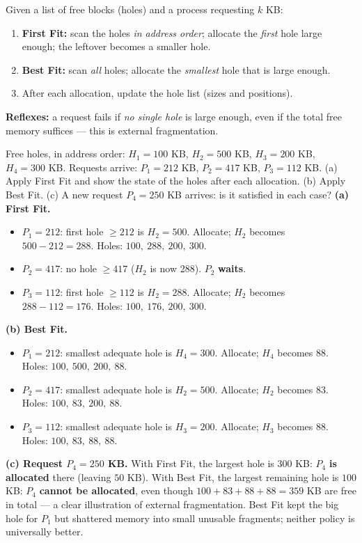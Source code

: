 \documentclass[11pt]{article}
\newcommand{\cle}[1]{{\popxbold\color{popdark}#1}}
\begin{document}
\begin{methode}
Given a list of free blocks (holes) and a process requesting $k$ KB:
\begin{enumerate}
\item \textbf{First Fit:} scan the holes \emph{in address order}; allocate the \emph{first} hole large enough; the leftover becomes a smaller hole.
\item \textbf{Best Fit:} scan \emph{all} holes; allocate the \emph{smallest} hole that is large enough.
\item After each allocation, update the hole list (sizes and positions).
\end{enumerate}
\textbf{Reflexes:} a request fails if \emph{no single hole} is large enough, even if the total free memory suffices — this is \cle{external fragmentation}.
\end{methode}

\begin{exoresolu}
Free holes, in address order: $H_1 = 100$ KB, $H_2 = 500$ KB, $H_3 = 200$ KB, $H_4 = 300$ KB. Requests arrive: $P_1 = 212$ KB, $P_2 = 417$ KB, $P_3 = 112$ KB. (a) Apply First Fit and show the state of the holes after each allocation. (b) Apply Best Fit. (c) A new request $P_4 = 250$ KB arrives: is it satisfied in each case?
\tcblower
\textbf{(a) First Fit.}
\begin{itemize}
\item $P_1 = 212$: first hole $\geq 212$ is $H_2 = 500$. Allocate; $H_2$ becomes $500 - 212 = 288$. Holes: $100,\ 288,\ 200,\ 300$.
\item $P_2 = 417$: no hole $\geq 417$ ($H_2$ is now 288). $P_2$ \textbf{waits}.
\item $P_3 = 112$: first hole $\geq 112$ is $H_2 = 288$. Allocate; $H_2$ becomes $288 - 112 = 176$. Holes: $100,\ 176,\ 200,\ 300$.
\end{itemize}
\textbf{(b) Best Fit.}
\begin{itemize}
\item $P_1 = 212$: smallest adequate hole is $H_4 = 300$. Allocate; $H_4$ becomes $88$. Holes: $100,\ 500,\ 200,\ 88$.
\item $P_2 = 417$: smallest adequate hole is $H_2 = 500$. Allocate; $H_2$ becomes $83$. Holes: $100,\ 83,\ 200,\ 88$.
\item $P_3 = 112$: smallest adequate hole is $H_3 = 200$. Allocate; $H_3$ becomes $88$. Holes: $100,\ 83,\ 88,\ 88$.
\end{itemize}
\textbf{(c) Request $P_4 = 250$ KB.} With First Fit, the largest hole is $300$ KB: $P_4$ \textbf{is allocated} there (leaving $50$ KB). With Best Fit, the largest remaining hole is $100$ KB: $P_4$ \textbf{cannot be allocated}, even though $100+83+88+88 = 359$ KB are free in total — a clear illustration of external fragmentation. Best Fit kept the big hole for $P_1$ but shattered memory into small unusable fragments; neither policy is universally better.
\end{exoresolu}
\end{document}
